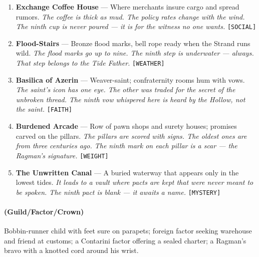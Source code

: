 \begin{enumerate}
\item \textbf{Exchange Coffee House} --- Where merchants insure cargo and spread rumors.
  \hfill \textit{The coffee is thick as mud. The policy rates change with the wind. The ninth cup is never poured --- it is for the witness no one wants.} \texttt{[SOCIAL]}
\item[J] \textbf{Flood-Stairs} --- Bronze flood marks, bell rope ready when the Strand runs wild.
  \hfill \textit{The flood marks go up to nine. The ninth step is underwater --- always. That step belongs to the Tide Father.} \texttt{[WEATHER]}
\item[Q] \textbf{Basilica of Azerin} --- Weaver-saint; confraternity rooms hum with vows.
  \hfill \textit{The saint's icon has one eye. The other was traded for the secret of the unbroken thread. The ninth vow whispered here is heard by the Hollow, not the saint.} \texttt{[FAITH]}
\item[K] \textbf{Burdened Arcade} --- Row of pawn shops and surety houses; promises carved on the pillars.
  \hfill \textit{The pillars are scored with signs. The oldest ones are from three centuries ago. The ninth mark on each pillar is a scar --- the Ragman's signature.} \texttt{[WEIGHT]}
\item[A] \textbf{The Unwritten Canal} --- A buried waterway that appears only in the lowest tides.
  \hfill \textit{It leads to a vault where pacts are kept that were never meant to be spoken. The ninth pact is blank --- it awaits a name.} \texttt{[MYSTERY]}
\end{enumerate}

\paragraph*{(Guild/Factor/Crown)} Bobbin-runner child with feet sure on parapets; foreign factor seeking warehouse and friend at customs; a Contarini factor offering a sealed charter; a Ragman's bravo with a knotted cord around his wrist.

